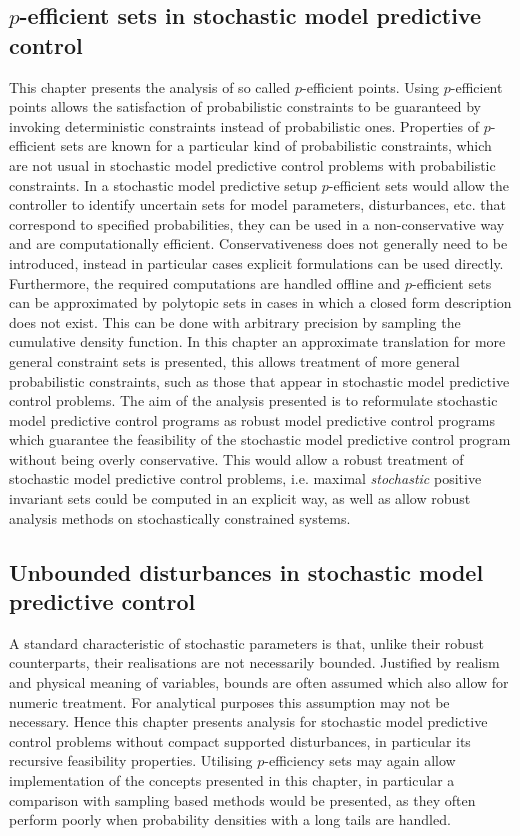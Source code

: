 \documentclass[a4paper,12pt]{scrartcl}
\begin{document}
\subsection{$p$-efficient sets in stochastic model predictive control}
This chapter presents the analysis of so called $p$-efficient points.
%
Using $p$-efficient points allows the satisfaction of probabilistic constraints to be guaranteed by invoking deterministic
constraints instead of probabilistic ones.
%
Properties of $p$-efficient sets are known for a particular kind of probabilistic constraints, which are not usual
in stochastic model predictive control problems with probabilistic constraints.
%
In a stochastic model predictive setup $p$-efficient sets would allow the controller to identify uncertain sets for 
model parameters, disturbances, etc. that correspond to specified probabilities, they can be used in a non-conservative way 
and are computationally efficient.
%
Conservativeness does not generally need to be introduced, instead in particular cases explicit formulations can be used 
directly.
%
Furthermore, the required computations are handled offline and $p$-efficient sets can be approximated by polytopic
sets in cases in which a closed form description does not exist.
%
This can be done with arbitrary precision by sampling the cumulative density function. 
%
In this chapter an approximate translation for more general constraint sets is presented, this allows treatment of
more general probabilistic constraints, such as those that appear in stochastic model predictive control problems.
%
The aim of the analysis presented is to reformulate stochastic model predictive control programs as robust model predictive
control programs which guarantee the feasibility of the stochastic model predictive control program without being overly
conservative.
%
This would allow a robust treatment of stochastic model predictive control problems, i.e. maximal \emph{stochastic} positive 
invariant sets could be computed in an explicit way, as well as allow robust analysis methods on stochastically constrained
systems.


\subsection{Unbounded disturbances in stochastic model predictive control}
A standard characteristic of stochastic parameters is that, unlike their robust counterparts, their realisations are not 
necessarily bounded.
%
Justified by realism and physical meaning of variables, bounds are often assumed which also allow for numeric treatment.
%
For analytical purposes this assumption may not be necessary.
%
Hence this chapter presents analysis for stochastic model predictive control problems without compact supported disturbances,
in particular its recursive feasibility properties.
%
Utilising $p$-efficiency sets may again allow implementation of the concepts presented in this chapter, in particular
a comparison with sampling based methods would be presented, as they often perform poorly when probability densities with a 
long tails are handled.
\end{document}
